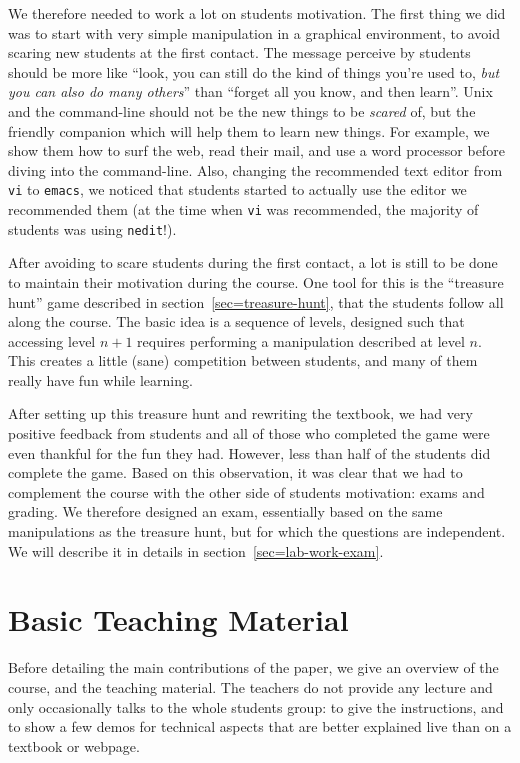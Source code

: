 \documentclass{sig-alternate}
\begin{document}
We therefore needed to work a lot on students motivation. The first
thing we did was to start with very simple manipulation in a graphical
environment, to avoid scaring new students at the first contact. The
message perceive by students should be more like ``look, you can still
do the kind of things you're used to, \emph{but you can also do many
  others}'' than ``forget all you know, and then learn''. Unix and the
command-line should not be the new things to be \emph{scared} of, but
the friendly companion which will help them to learn new things. For
example, we show them how to surf the web, read their mail, and use a
word processor before diving into the command-line. Also, changing the
recommended text editor from \texttt{vi} to \texttt{emacs}, we noticed
that students started to actually use the editor we recommended them
(at the time when \texttt{vi} was recommended, the majority of
students was using \texttt{nedit}!).

After avoiding to scare students during the first contact, a lot is
still to be done to maintain their motivation during the course. One
tool for this is the ``treasure hunt'' game described in
section~\ref{sec=treasure-hunt}, that the students follow all along
the course. The basic idea is a sequence of levels, designed such that
accessing level $n+1$ requires performing a manipulation described at
level $n$. This creates a little (sane) competition between students,
and many of them really have fun while learning.

\label{motivation-exam}
After setting up this treasure hunt and rewriting the textbook, we had
very positive feedback from students and all of those who completed the
game were even thankful for the fun they had. However, less than half
of the students did complete the game. Based on this observation, it
was clear that we had to complement the course with the other side of
students motivation: exams and grading. We therefore designed an exam,
essentially based on the same manipulations as the treasure hunt, but
for which the questions are independent. We will describe it in
details in section~\ref{sec=lab-work-exam}.

\section{Basic Teaching Material}
\label{sec=material}

Before detailing the main contributions of the paper, we give an
overview of the course, and the teaching material.
The teachers do
not provide any lecture and only occasionally talks to the whole
students group: to give the instructions, and to show a few demos for
technical aspects that are better explained live than on a textbook or
webpage.
\end{document}
